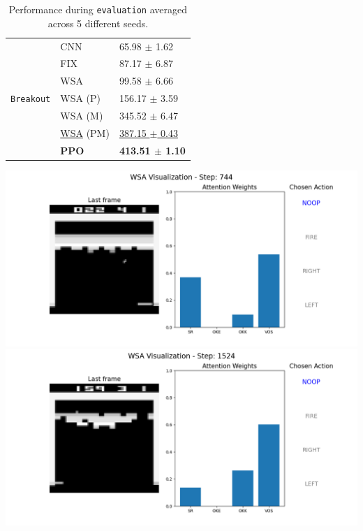 \begin{table}[ht]
\begin{minipage}[b]{0.49\linewidth}
\begin{tabular}[b]{lll}
                \multirow{7}{*}{\texttt{Breakout}}
                                      & CNN & 65.98 $\pm$ 1.62 \\
                                      & FIX & 87.17 $\pm$ 6.87 \\
                                      & WSA & 99.58 $\pm$ 6.66 \\
                                      & WSA (P) & 156.17 $\pm$ 3.59 \\
                                      & WSA (M) & 345.52 $\pm$ 6.47 \\
                                      & \underline{WSA} (PM)& \underline{387.15 $\pm$ 0.43} \\
                                      & \textbf{PPO} & \textbf{413.51 $\pm$ 1.10}\\
    \end{tabular}
    \caption{Performance during \texttt{evaluation} averaged across 5 different seeds.}
    \label{tab:results}
\end{minipage}\hfill
\begin{minipage}[b]{0.49\linewidth}
\centering
\includegraphics[width=\textwidth]{images/744.png}
\includegraphics[width=\textwidth]{images/1524.png}
\label{fig:inter}
\end{minipage}
\end{table}



